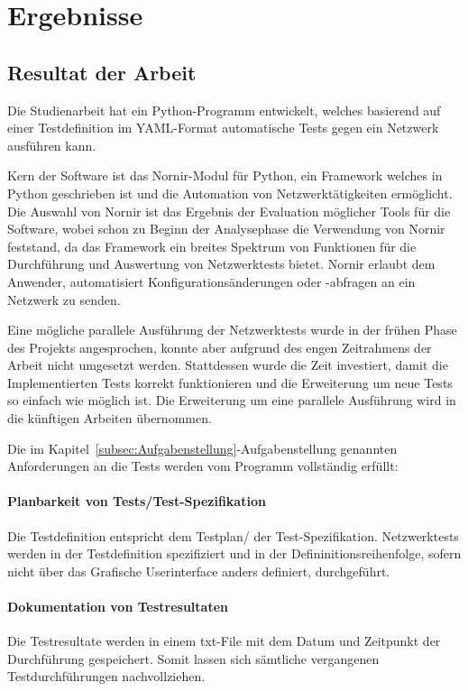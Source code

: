 \documentclass[]{subfiles}
\begin{document}
\section{Ergebnisse}
\subsection{Resultat der Arbeit}
Die Studienarbeit hat ein Python-Programm entwickelt, welches basierend auf einer Testdefinition
im YAML-Format automatische Tests gegen ein Netzwerk ausführen kann.

Kern der Software ist das Nornir-Modul für Python, ein Framework welches in Python geschrieben
ist und die Automation von Netzwerktätigkeiten ermöglicht. 
Die Auswahl von Nornir ist das Ergebnis der Evaluation möglicher Tools für die Software,
wobei schon zu Beginn der Analysephase die Verwendung von Nornir feststand, da das
Framework ein breites Spektrum von Funktionen für die Durchführung und Auswertung von 
Netzwerktests bietet.
Nornir erlaubt dem Anwender, automatisiert Konfigurationsänderungen oder -abfragen an ein 
Netzwerk zu senden.

Eine mögliche parallele Ausführung der Netzwerktests wurde in der frühen Phase des Projekts
angesprochen, konnte aber aufgrund des engen Zeitrahmens der Arbeit nicht umgesetzt werden.
Stattdessen wurde die Zeit investiert, damit die Implementierten Tests korrekt funktionieren
und die Erweiterung um neue Tests so einfach wie möglich ist.
Die Erweiterung um eine parallele Ausführung wird in die künftigen Arbeiten übernommen.

Die im Kapitel~\ref{subsec:Aufgabenstellung}-Aufgabenstellung genannten Anforderungen an 
die Tests werden vom Programm vollständig erfüllt:

\paragraph{Planbarkeit von Tests/Test-Spezifikation} 
Die Testdefinition entspricht dem Testplan/ der Test-Spezifikation.
Netzwerktests werden in der Testdefinition spezifiziert und in der Defininitionsreihenfolge,
sofern nicht über das Grafische Userinterface anders definiert, durchgeführt.

\paragraph{Dokumentation von Testresultaten} 
Die Testresultate werden in einem txt-File mit dem Datum und Zeitpunkt der Durchführung 
gespeichert. 
Somit lassen sich sämtliche vergangenen Testdurchführungen nachvollziehen.
\end{document}
